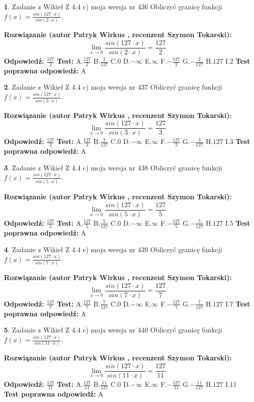 \documentclass[12pt, a4paper]{article}
\theoremstyle{definition} %
\newtheorem{zad}{}
\newcommand{\zadStart}[1]{\begin{zad}#1\newline}
\newcommand{\zadStop}{\end{zad}}
\newcommand{\rozwStart}[2]{\noindent \textbf{Rozwiązanie (autor #1 , recenzent #2): }\newline}
\newcommand{\rozwStop}{\newline}
\newcommand{\odpStart}{\noindent \textbf{Odpowiedź:}\newline}
\newcommand{\odpStop}{\newline}
\newcommand{\testStart}{\noindent \textbf{Test:}\newline}
\newcommand{\testStop}{\newline}
\newcommand{\kluczStart}{\noindent \textbf{Test poprawna odpowiedź:}\newline}
\newcommand{\kluczStop}{\newline}
\begin{document}
\zadStart{Zadanie z Wikieł Z 4.4 c) moja wersja nr 436}
Obliczyć granicę funkcji $f(x)=\frac{sin(127\cdot x)}{sin(2\cdot x)}$.
\zadStop
\rozwStart{Patryk Wirkus}{Szymon Tokarski}
$$\lim\limits_{x\to 0}\frac{sin(127\cdot x)}{sin(2\cdot x)}=
\frac{127}{2}$$
\rozwStop
\odpStart
$\frac{127}{2}$
\odpStop
\testStart
A.$\frac{127}{2}$
B.$\frac{2}{127}$
C.$0$
D.$-\infty$
E.$\infty$
F.$-\frac{127}{2}$
G.$-\frac{2}{127}$
H.$127$
I.$2$
\testStop
\kluczStart
A
\kluczStop



\zadStart{Zadanie z Wikieł Z 4.4 c) moja wersja nr 437}
Obliczyć granicę funkcji $f(x)=\frac{sin(127\cdot x)}{sin(3\cdot x)}$.
\zadStop
\rozwStart{Patryk Wirkus}{Szymon Tokarski}
$$\lim\limits_{x\to 0}\frac{sin(127\cdot x)}{sin(3\cdot x)}=
\frac{127}{3}$$
\rozwStop
\odpStart
$\frac{127}{3}$
\odpStop
\testStart
A.$\frac{127}{3}$
B.$\frac{3}{127}$
C.$0$
D.$-\infty$
E.$\infty$
F.$-\frac{127}{3}$
G.$-\frac{3}{127}$
H.$127$
I.$3$
\testStop
\kluczStart
A
\kluczStop



\zadStart{Zadanie z Wikieł Z 4.4 c) moja wersja nr 438}
Obliczyć granicę funkcji $f(x)=\frac{sin(127\cdot x)}{sin(5\cdot x)}$.
\zadStop
\rozwStart{Patryk Wirkus}{Szymon Tokarski}
$$\lim\limits_{x\to 0}\frac{sin(127\cdot x)}{sin(5\cdot x)}=
\frac{127}{5}$$
\rozwStop
\odpStart
$\frac{127}{5}$
\odpStop
\testStart
A.$\frac{127}{5}$
B.$\frac{5}{127}$
C.$0$
D.$-\infty$
E.$\infty$
F.$-\frac{127}{5}$
G.$-\frac{5}{127}$
H.$127$
I.$5$
\testStop
\kluczStart
A
\kluczStop



\zadStart{Zadanie z Wikieł Z 4.4 c) moja wersja nr 439}
Obliczyć granicę funkcji $f(x)=\frac{sin(127\cdot x)}{sin(7\cdot x)}$.
\zadStop
\rozwStart{Patryk Wirkus}{Szymon Tokarski}
$$\lim\limits_{x\to 0}\frac{sin(127\cdot x)}{sin(7\cdot x)}=
\frac{127}{7}$$
\rozwStop
\odpStart
$\frac{127}{7}$
\odpStop
\testStart
A.$\frac{127}{7}$
B.$\frac{7}{127}$
C.$0$
D.$-\infty$
E.$\infty$
F.$-\frac{127}{7}$
G.$-\frac{7}{127}$
H.$127$
I.$7$
\testStop
\kluczStart
A
\kluczStop



\zadStart{Zadanie z Wikieł Z 4.4 c) moja wersja nr 440}
Obliczyć granicę funkcji $f(x)=\frac{sin(127\cdot x)}{sin(11\cdot x)}$.
\zadStop
\rozwStart{Patryk Wirkus}{Szymon Tokarski}
$$\lim\limits_{x\to 0}\frac{sin(127\cdot x)}{sin(11\cdot x)}=
\frac{127}{11}$$
\rozwStop
\odpStart
$\frac{127}{11}$
\odpStop
\testStart
A.$\frac{127}{11}$
B.$\frac{11}{127}$
C.$0$
D.$-\infty$
E.$\infty$
F.$-\frac{127}{11}$
G.$-\frac{11}{127}$
H.$127$
I.$11$
\testStop
\kluczStart
A
\kluczStop
\end{document}
